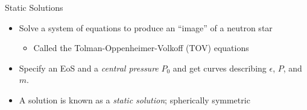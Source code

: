 \documentclass[]{beamer}
\begin{document}
    \begin{frame}{Static Solutions}
        \pause
        \begin{itemize}
            \item Solve a system of equations to produce an ``image'' of a neutron star \pause
            \begin{itemize}
                \item Called the Tolman-Oppenheimer-Volkoff (TOV) equations \pause
            \end{itemize}
            \item Specify an EoS and a \textit{central pressure} $P_0$ and get curves describing $\epsilon$, $P$, and $m$. \pause 
            \item A solution is known as a \textit{static solution}\pause ; spherically symmetric\pause
        \end{itemize}


\end{frame}
\end{document}
